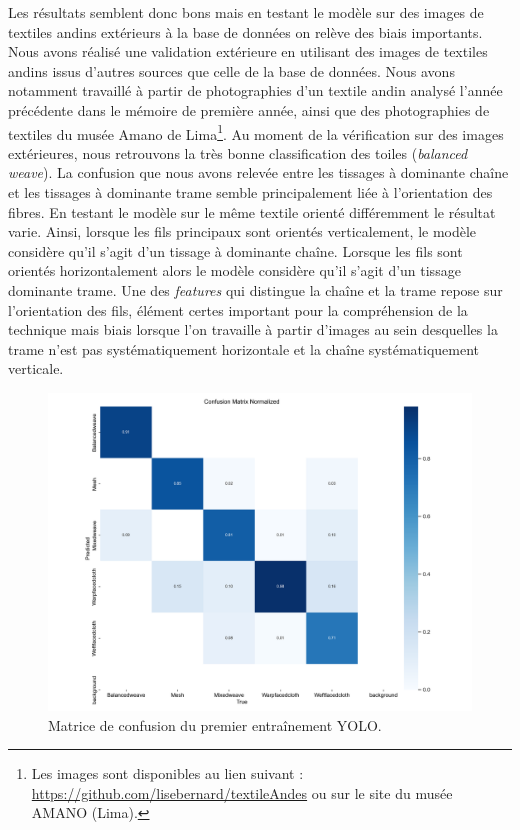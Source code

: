 Les résultats semblent donc bons mais en testant le modèle sur des images de textiles andins extérieurs à la base de données on relève des biais importants. Nous avons réalisé une validation extérieure en utilisant des images de textiles andins issus d'autres sources que celle de la base de données. Nous avons notamment travaillé à partir de photographies d'un textile andin analysé l'année précédente dans le mémoire de première année, ainsi que des photographies de textiles du musée Amano de Lima\footnote{Les images sont disponibles au lien suivant : \url{https://github.com/lisebernard/textileAndes} ou sur le site du musée AMANO (Lima).}. Au moment de la vérification sur des images extérieures, nous retrouvons la très bonne classification des toiles (\textit{balanced weave}). La confusion que nous avons relevée entre les tissages à dominante chaîne et les tissages à dominante trame semble principalement liée à l'orientation des fibres. En testant le modèle sur le même textile orienté différemment le résultat varie. Ainsi, lorsque les fils principaux sont orientés verticalement, le modèle considère qu'il s'agit d'un tissage à dominante chaîne. Lorsque les fils sont orientés horizontalement alors le modèle considère qu'il s'agit d'un tissage dominante trame. Une des \textit{features} qui distingue la chaîne et la trame repose sur l'orientation des fils, élément certes important pour la compréhension de la technique mais biais lorsque l'on travaille à partir d'images au sein desquelles la trame n'est pas systématiquement horizontale et la chaîne systématiquement verticale. 

\begin{figure}[!h]
	\begin{center}
		\includegraphics[width=16cm]{../images/YOLO_50epoch_confusion_matrix_normalized.png}
		\caption{Matrice de confusion du premier entraînement YOLO.}
	 \end{center}
\end{figure}

